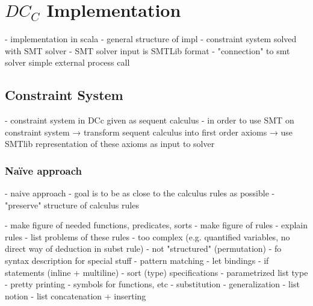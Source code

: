 \chapter{$DC_C$ Implementation}
- implementation in scala
- general structure of impl
  - constraint system solved with SMT solver
  - SMT solver input is SMTLib format
  - "connection" to smt solver simple external process call

\section{Constraint System}
- constraint system in DCc given as sequent calculus
- in order to use SMT on constraint system
  → transform sequent calculus into first order axioms
  → use SMTlib representation of these axioms as input to solver
\subsection{Na\"ive approach}
- naive approach
- goal is to be as close to the calculus rules as possible
- "preserve" structure of calculus rules

- make figure of needed functions, predicates, sorts
- make figure of rules
- explain rules
- list problems of these rules
  - too complex (e.g. quantified variables, no direct way of deduction in subst rule)
  - not "structured" (permutation)
- fo syntax description for special stuff
  - pattern matching
  - let bindings
  - if statements (inline + multiline)
  - sort (type) specifications
  - parametrized list type
- pretty printing
  - symbols for functions, etc
  - substitution
  - generalization
  - list notion
  - list concatenation + inserting

